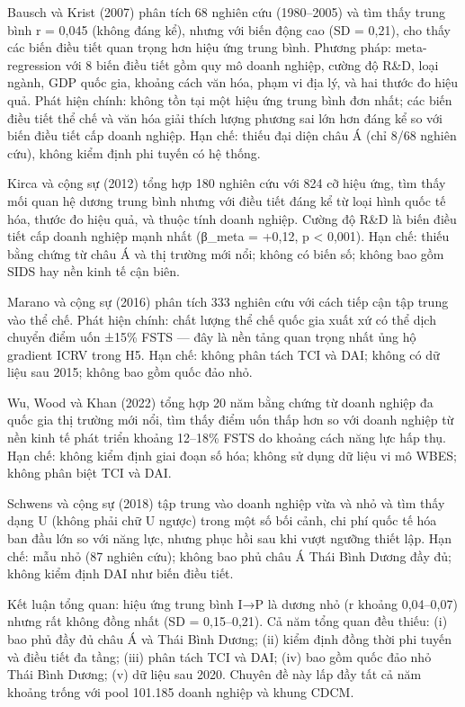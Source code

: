 \documentclass[12pt,a4paper]{article}
\begin{document}
Bausch và Krist (2007) phân tích 68 nghiên cứu (1980--2005) và tìm thấy
trung bình r = 0,045 (không đáng kể), nhưng với biến động cao (SD =
0,21), cho thấy các biến điều tiết quan trọng hơn hiệu ứng trung bình.
Phương pháp: meta-regression với 8 biến điều tiết gồm quy mô doanh
nghiệp, cường độ R\&D, loại ngành, GDP quốc gia, khoảng cách văn hóa,
phạm vi địa lý, và hai thước đo hiệu quả. Phát hiện chính: không tồn tại
một hiệu ứng trung bình đơn nhất; các biến điều tiết thể chế và văn hóa
giải thích lượng phương sai lớn hơn đáng kể so với biến điều tiết cấp
doanh nghiệp. Hạn chế: thiếu đại diện châu Á (chỉ 8/68 nghiên cứu),
không kiểm định phi tuyến có hệ thống.

Kirca và cộng sự (2012) tổng hợp 180 nghiên cứu với 824 cỡ hiệu ứng, tìm
thấy mối quan hệ dương trung bình nhưng với điều tiết đáng kể từ loại
hình quốc tế hóa, thước đo hiệu quả, và thuộc tính doanh nghiệp. Cường
độ R\&D là biến điều tiết cấp doanh nghiệp mạnh nhất (β\_meta = +0,12, p
\textless{} 0,001). Hạn chế: thiếu bằng chứng từ châu Á và thị trường
mới nổi; không có biến số; không bao gồm SIDS hay nền kinh tế cận biên.

Marano và cộng sự (2016) phân tích 333 nghiên cứu với cách tiếp cận tập
trung vào thể chế. Phát hiện chính: chất lượng thể chế quốc gia xuất xứ
có thể dịch chuyển điểm uốn ±15\% FSTS --- đây là nền tảng quan trọng
nhất ủng hộ gradient ICRV trong H5. Hạn chế: không phân tách TCI và DAI;
không có dữ liệu sau 2015; không bao gồm quốc đảo nhỏ.

Wu, Wood và Khan (2022) tổng hợp 20 năm bằng chứng từ doanh nghiệp đa
quốc gia thị trường mới nổi, tìm thấy điểm uốn thấp hơn so với doanh
nghiệp từ nền kinh tế phát triển khoảng 12--18\% FSTS do khoảng cách
năng lực hấp thụ. Hạn chế: không kiểm định giai đoạn số hóa; không sử
dụng dữ liệu vi mô WBES; không phân biệt TCI và DAI.

Schwens và cộng sự (2018) tập trung vào doanh nghiệp vừa và nhỏ và tìm
thấy dạng U (không phải chữ U ngược) trong một số bối cảnh, chi phí quốc
tế hóa ban đầu lớn so với năng lực, nhưng phục hồi sau khi vượt ngưỡng
thiết lập. Hạn chế: mẫu nhỏ (87 nghiên cứu); không bao phủ châu Á Thái
Bình Dương đầy đủ; không kiểm định DAI như biến điều tiết.

Kết luận tổng quan: hiệu ứng trung bình I→P là dương nhỏ (r khoảng
0,04--0,07) nhưng rất không đồng nhất (SD = 0,15--0,21). Cả năm tổng
quan đều thiếu: (i) bao phủ đầy đủ châu Á và Thái Bình Dương; (ii) kiểm
định đồng thời phi tuyến và điều tiết đa tầng; (iii) phân tách TCI và
DAI; (iv) bao gồm quốc đảo nhỏ Thái Bình Dương; (v) dữ liệu sau 2020.
Chuyên đề này lấp đầy tất cả năm khoảng trống với pool 101.185 doanh
nghiệp và khung CDCM.
\end{document}
